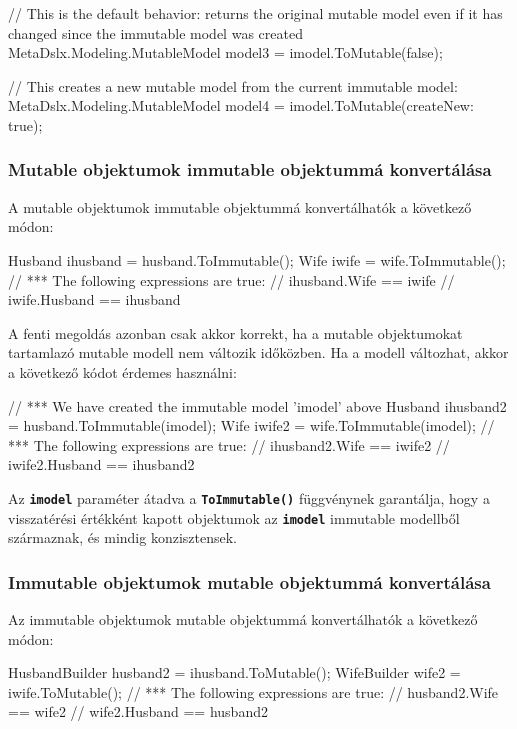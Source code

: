 \documentclass[12pt, a4paper]{report}
\newcommand{\ff}[1]{\textbf{\texttt{#1}}}
\begin{document}
\begin{csharpcode}
// This is the default behavior: returns the original mutable model even if it has changed since the immutable model was created
MetaDslx.Modeling.MutableModel model3 = imodel.ToMutable(false); 

// This creates a new mutable model from the current immutable model:
MetaDslx.Modeling.MutableModel model4 = imodel.ToMutable(createNew: true);
\end{csharpcode}

\subsubsection{Mutable objektumok immutable objektummá konvertálása}

A mutable objektumok immutable objektummá konvertálhatók a következő módon:

\begin{csharpcode}
Husband ihusband = husband.ToImmutable();
Wife iwife = wife.ToImmutable();
// *** The following expressions are true:
// ihusband.Wife == iwife
// iwife.Husband == ihusband
\end{csharpcode}

A fenti megoldás azonban csak akkor korrekt, ha a mutable objektumokat tartamlazó mutable modell nem változik időközben. Ha a modell változhat, akkor a következő kódot érdemes használni:

\begin{csharpcode}
// *** We have created the immutable model 'imodel' above
Husband ihusband2 = husband.ToImmutable(imodel);
Wife iwife2 = wife.ToImmutable(imodel);
// *** The following expressions are true:
// ihusband2.Wife == iwife2
// iwife2.Husband == ihusband2
\end{csharpcode}

Az \ff{imodel} paraméter átadva a \ff{ToImmutable()} függvénynek garantálja, hogy a visszatérési értékként kapott objektumok az \ff{imodel} immutable modellből származnak, és mindig konzisztensek.

\subsubsection{Immutable objektumok mutable objektummá konvertálása}

Az immutable objektumok mutable objektummá konvertálhatók a következő módon:

\begin{csharpcode}
HusbandBuilder husband2 = ihusband.ToMutable();
WifeBuilder wife2 = iwife.ToMutable();
// *** The following expressions are true:
// husband2.Wife == wife2
// wife2.Husband == husband2
\end{csharpcode}
\end{document}
